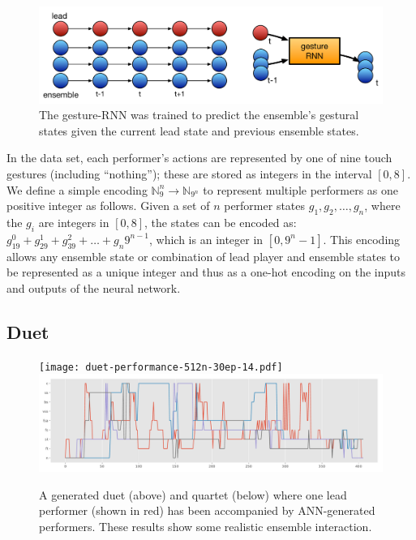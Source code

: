\documentclass[sigchi]{acmart} %
\begin{document}
\begin{figure}
  \includegraphics[width=\columnwidth]{nn-ensemble-training}
  \caption{The gesture-RNN was trained to predict the ensemble's
    gestural states given the current lead state and previous ensemble
    states.}\label{fig:nn-ensemble-training}
\end{figure}

In the data set, each performer's actions are represented by one of
nine touch gestures (including ``nothing''); these are stored as
integers in the interval $[0,8]$. We define a simple encoding
$\mathbb{N}_{9}^n \rightarrow \mathbb{N}_{9^n}$ to represent multiple
performers as one positive integer as follows. Given a set of $n$
performer states $g_1, g_2, \ldots, g_n$, where the $g_i$ are integers
in $[0,8]$, the states can be encoded as:
$ g_19^0 + g_29^1 + g_39^2 + \ldots + g_n9^{n-1} $, which is an integer
in $[0,9^n - 1]$.
This encoding allows any ensemble state or combination of lead player
and ensemble states to be represented as a unique integer and thus as
a one-hot encoding on the inputs and outputs of the neural network.

\subsection{Duet}

\begin{figure}
  \centering
  \texttt{[image: duet-performance-512n-30ep-14.pdf]}
  \includegraphics[width=\columnwidth]{gesture-rnn-4to3-512n3l-perf-102.pdf}
  \caption{A generated duet (above) and quartet (below) where one lead
    performer (shown in red) has been accompanied by ANN-generated
    performers. These results
    show some realistic ensemble interaction.}\label{fig:model-examples}
\end{figure}
\end{document}
